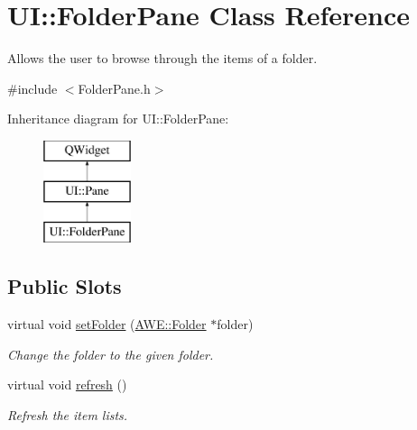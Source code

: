 \hypertarget{class_u_i_1_1_folder_pane}{\section{U\-I\-:\-:Folder\-Pane Class Reference}
\label{class_u_i_1_1_folder_pane}
}


Allows the user to browse through the items of a folder.  




{\ttfamily \#include $<$Folder\-Pane.\-h$>$}

Inheritance diagram for U\-I\-:\-:Folder\-Pane\-:\begin{figure}[H]
\begin{center}
\leavevmode
\includegraphics[height=3.000000cm]{class_u_i_1_1_folder_pane}
\end{center}
\end{figure}
\subsection*{Public Slots}
\begin{DoxyCompactItemize}
\item 
virtual void \hyperlink{class_u_i_1_1_folder_pane_a11aba288e19d15bb91c25566140a7535}{set\-Folder} (\hyperlink{class_a_w_e_1_1_folder}{A\-W\-E\-::\-Folder} $\ast$folder)
\begin{DoxyCompactList}\small\item\em Change the folder to the given folder. \end{DoxyCompactList}\item 
\hypertarget{class_u_i_1_1_folder_pane_a2923b1d8fa68cd3004c1c8da1c22c2f4}{virtual void \hyperlink{class_u_i_1_1_folder_pane_a2923b1d8fa68cd3004c1c8da1c22c2f4}{refresh} ()}\label{class_u_i_1_1_folder_pane_a2923b1d8fa68cd3004c1c8da1c22c2f4}

\begin{DoxyCompactList}\small\item\em Refresh the item lists. \end{DoxyCompactList}\end{DoxyCompactItemize}
